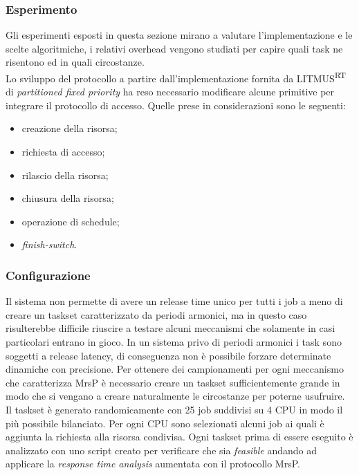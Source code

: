 {\subsubsection{Esperimento}
\label{sec:overhead_exp}

\noindent Gli esperimenti esposti in questa sezione mirano a valutare l'implementazione e le scelte algoritmiche, i relativi overhead vengono studiati per capire quali task ne risentono ed in quali circostanze.\\

\noindent Lo sviluppo del protocollo a partire dall'implementazione fornita da LITMUS\textsuperscript{RT} di \textit{partitioned fixed priority} ha reso necessario modificare alcune primitive per integrare il protocollo di accesso. Quelle prese in considerazioni sono le seguenti:

\begin{itemize}
	\item creazione della risorsa;
	\item richiesta di accesso;
	\item rilascio della risorsa;
	\item chiusura della risorsa;
	\item operazione di schedule;
	\item \textit{finish-switch}.
\end{itemize}

\subsubsection{Configurazione}
\label{sec:overhead_conf}

\noindent Il sistema non permette di avere un release time unico per tutti i job a meno di creare un taskset caratterizzato da periodi armonici, ma in questo caso risulterebbe difficile riuscire a testare alcuni meccanismi che solamente in casi particolari entrano in gioco. In un sistema privo di periodi armonici i task sono soggetti a release latency, di conseguenza non è possibile forzare determinate dinamiche con precisione. Per ottenere dei campionamenti per ogni meccanismo che caratterizza MrsP è necessario creare un taskset sufficientemente grande in modo che si vengano a creare naturalmente le circostanze per poterne usufruire.\\
\noindent Il taskset è generato randomicamente con 25 job suddivisi su 4 CPU in modo il più possibile bilanciato. Per ogni CPU sono selezionati alcuni job ai quali è aggiunta la richiesta alla risorsa condivisa. Ogni taskset prima di essere eseguito è analizzato con uno script creato per verificare che sia \textit{feasible} andando ad applicare la \textit{response time analysis} aumentata con il protocollo MrsP.\\

}

